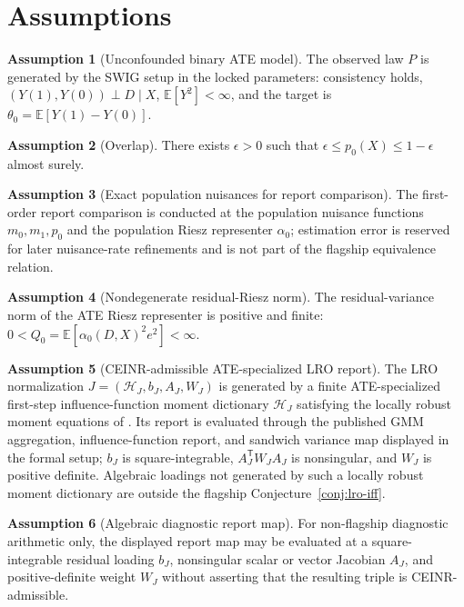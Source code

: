 \documentclass[11pt]{article}
\newcommand{\E}{\mathbb{E}}
\newcommand{\transpose}{\mathsf{T}}
\theoremstyle{definition}
\newtheorem{assumption}{Assumption}
\theoremstyle{plain}
\theoremstyle{remark}
\begin{document}
\section{Assumptions}
\begin{assumption}[Unconfounded binary ATE model]\label{ass:ate-model}
The observed law $P$ is generated by the SWIG setup in the locked parameters: consistency holds, $(Y(1),Y(0))\perp D\mid X$, $\E[Y^2]<\infty$, and the target is $\theta_0=\E[Y(1)-Y(0)]$.
\end{assumption}

\begin{assumption}[Overlap]\label{ass:overlap}
There exists $\epsilon>0$ such that $\epsilon\le p_0(X)\le 1-\epsilon$ almost surely.
\end{assumption}

\begin{assumption}[Exact population nuisances for report comparison]\label{ass:exact-nuisance}
The first-order report comparison is conducted at the population nuisance functions $m_0,m_1,p_0$ and the population Riesz representer $\alpha_0$; estimation error is reserved for later nuisance-rate refinements and is not part of the flagship equivalence relation.
\end{assumption}

\begin{assumption}[Nondegenerate residual-Riesz norm]\label{ass:nondegenerate-riesz}
The residual-variance norm of the ATE Riesz representer is positive and finite: $0<Q_0=\E[\alpha_0(D,X)^2e^2]<\infty$.
\end{assumption}

\begin{assumption}[CEINR-admissible ATE-specialized LRO report]\label{ass:lro-report}
The LRO normalization $J=(\mathcal H_J,b_J,A_J,W_J)$ is generated by a finite ATE-specialized first-step influence-function moment dictionary $\mathcal H_J$ satisfying the locally robust moment equations of \citet{ChernozhukovEscancianoIchimuraNeweyRobins2022LRO}.  Its report is evaluated through the published GMM aggregation, influence-function report, and sandwich variance map displayed in the formal setup; $b_J$ is square-integrable, $A_J^\transpose W_JA_J$ is nonsingular, and $W_J$ is positive definite.  Algebraic loadings not generated by such a locally robust moment dictionary are outside the flagship Conjecture~\ref{conj:lro-iff}.
\end{assumption}

\begin{assumption}[Algebraic diagnostic report map]\label{ass:diagnostic-map}
For non-flagship diagnostic arithmetic only, the displayed report map may be evaluated at a square-integrable residual loading $b_J$, nonsingular scalar or vector Jacobian $A_J$, and positive-definite weight $W_J$ without asserting that the resulting triple is CEINR-admissible.
\end{assumption}
\end{document}
